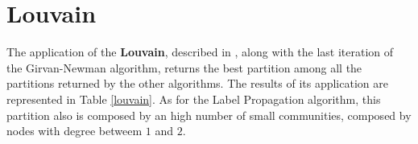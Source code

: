     \begin{table}[H]
        \centering
        \begin{subtable}{\textwidth}
        \end{subtable}
        \caption{Evaluation of the partition obtained by the application of the Label Propagaion algorithm.}
        \label{labelprop}
    \end{table}


\section{Louvain} %
\label{sec:louvain}
    The application of the \textbf{Louvain}, described in \cite{louvain}, along with the last iteration of the
    Girvan-Newman algorithm, returns the best partition among all the partitions returned by the other algorithms.
    The results of its application are represented in Table \ref{louvain}. As for the Label Propagation algorithm,
    this partition also is composed by an high number of small communities, composed by nodes with degree betweem
    $1$ and $2$.

    \begin{table}[H]
        \centering
        \begin{subtable}{\textwidth}
        \end{subtable}
        \caption{Evaluation of the partition obtained by the application of the Louvain algorithm.}
        \label{louvain}
    \end{table}

